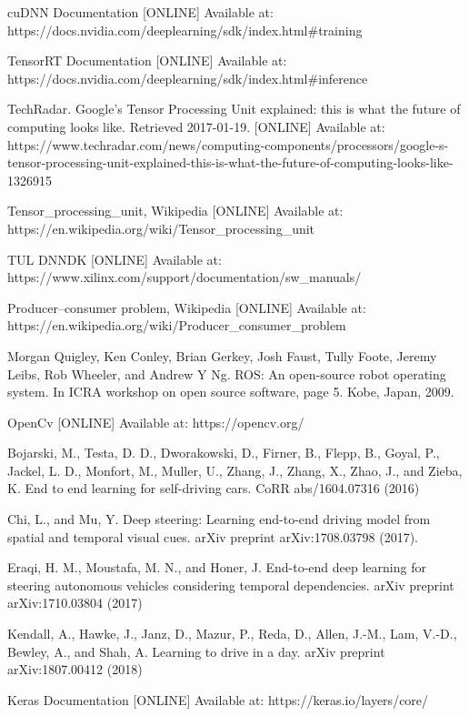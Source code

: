 \documentclass[conference]{IEEEtran}
\begin{document}
\begin{sloppypar}
\begin{thebibliography}{00}
 cuDNN Documentation [ONLINE] Available at: https://docs.nvidia.com/deeplearning/sdk/index.html\#training

 TensorRT Documentation [ONLINE] Available at: https://docs.nvidia.com/deeplearning/sdk/index.html\#inference

 TechRadar. Google's Tensor Processing Unit explained: this is what the future of computing looks like. Retrieved 2017-01-19. [ONLINE] Available at: https://www.techradar.com/news/computing-components/processors/google-s-tensor-processing-unit-explained-this-is-what-the-future-of-computing-looks-like-1326915

 Tensor\_processing\_unit, Wikipedia [ONLINE] Available at: https://en.wikipedia.org/wiki/Tensor\_processing\_unit

 TUL DNNDK [ONLINE] Available at: https://www.xilinx.com/support/documentation/sw\_manuals/

 Producer–consumer problem, Wikipedia [ONLINE] Available at: https://en.wikipedia.org/wiki/Producer\_consumer\_problem

 Morgan Quigley, Ken Conley, Brian Gerkey, Josh Faust, Tully Foote, Jeremy Leibs, Rob Wheeler, and Andrew Y Ng. ROS: An open-source robot operating system. In ICRA workshop on open source software, page 5. Kobe, Japan, 2009.

 OpenCv [ONLINE] Available at: https://opencv.org/

 Bojarski, M., Testa, D. D., Dworakowski, D., Firner, B., Flepp, B., Goyal, P., Jackel, L. D., Monfort, M., Muller, U., Zhang, J., Zhang, X., Zhao, J., and Zieba, K. End to end learning for self-driving cars. CoRR abs/1604.07316 (2016)

 Chi, L., and Mu, Y. Deep steering: Learning end-to-end driving model from spatial and temporal visual cues. arXiv preprint arXiv:1708.03798 (2017).

 Eraqi, H. M., Moustafa, M. N., and Honer, J. End-to-end deep learning for steering autonomous vehicles considering temporal dependencies. arXiv preprint arXiv:1710.03804 (2017)

 Kendall, A., Hawke, J., Janz, D., Mazur, P., Reda, D., Allen, J.-M., Lam, V.-D., Bewley, A., and Shah, A. Learning to drive in a day. arXiv preprint arXiv:1807.00412 (2018)

 Keras Documentation [ONLINE] Available at: https://keras.io/layers/core/


\end{thebibliography}
\end{sloppypar}
\end{document}
